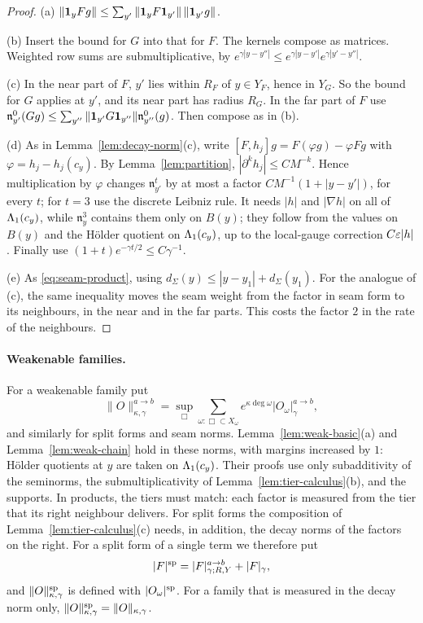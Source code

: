 \begin{proof}
(a) $\|\mathbf 1_yFg\|\le\sum_{y'}\|\mathbf 1_yF\mathbf 1_{y'}\|\,\|\mathbf 1_{y'}g\|$.

(b) Insert the bound for $G$ into that for $F$. The kernels compose as matrices. Weighted row sums are submultiplicative, by $e^{\gamma|y-y''|}\le e^{\gamma|y-y'|}e^{\gamma|y'-y''|}$.

(c) In the near part of $F$, $y'$ lies within $R_F$ of $y\in Y_F$, hence in $Y_G$. So the bound for $G$ applies at $y'$, and its near part has radius $R_G$. In the far part of $F$ use $\mathfrak n^0_{y'}(Gg)\le\sum_{y''}\|\mathbf 1_{y'}G\mathbf 1_{y''}\|\mathfrak n^0_{y''}(g)$. Then compose as in (b).

(d) As in Lemma~\ref{lem:decay-norm}(c), write $[F,h_j]g=F(\varphi g)-\varphi Fg$ with $\varphi=h_j-h_j(c_y)$. By Lemma~\ref{lem:partition}, $|\partial^k h_j|\le CM^{-k}$. Hence multiplication by $\varphi$ changes $\mathfrak n^t_{y'}$ by at most a factor $CM^{-1}(1+|y-y'|)$, for every $t$; for $t=3$ use the discrete Leibniz rule. It needs $|h|$ and $|\nabla h|$ on all of $\Lambda_1(c_y)$, while $\mathfrak n^3_y$ contains them only on $B(y)$; they follow from the values on $B(y)$ and the H\"older quotient on $\Lambda_1(c_y)$, up to the local-gauge correction $C\varepsilon|h|$. Finally use $(1+t)e^{-\gamma t/2}\le C\gamma^{-1}$.

(e) As \eqref{eq:seam-product}, using $d_\Sigma(y)\le|y-y_1|+d_\Sigma(y_1)$. For the analogue of (c), the same inequality moves the seam weight from the factor in seam form to its neighbours, in the near and in the far parts. This costs the factor $2$ in the rate of the neighbours.
\end{proof}

\paragraph{Weakenable families.} For a weakenable family put
\[
\|O\|^{a\to b}_{\kappa,\gamma}=\sup_\Box\sum_{\omega:\Box\subset X_\omega}e^{\kappa\deg\omega}|O_\omega|^{a\to b}_\gamma ,
\]
and similarly for split forms and seam norms. Lemma~\ref{lem:weak-basic}(a) and Lemma~\ref{lem:weak-chain} hold in these norms, with margins increased by $1$: H\"older quotients at $y$ are taken on $\Lambda_1(c_y)$. Their proofs use only subadditivity of the seminorms, the submultiplicativity of Lemma~\ref{lem:tier-calculus}(b), and the supports. In products, the tiers must match: each factor is measured from the tier that its right neighbour delivers. For split forms the composition of Lemma~\ref{lem:tier-calculus}(c) needs, in addition, the decay norms of the factors on the right. For a split form of a single term we therefore put
\[
|F|^{\rm sp}=|F|^{a\to b}_{\gamma;R,Y}+|F|_\gamma ,
\]
and $\|O\|^{\rm sp}_{\kappa,\gamma}$ is defined with $|O_\omega|^{\rm sp}$. For a family that is measured in the decay norm only, $\|O\|^{\rm sp}_{\kappa,\gamma}=\|O\|_{\kappa,\gamma}$.

